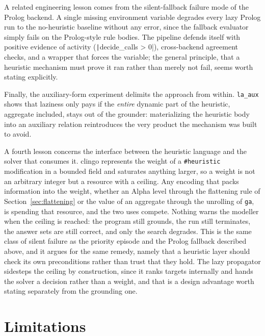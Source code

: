 A related engineering lesson comes from the silent-fallback failure mode of the Prolog backend. A single missing environment variable degrades every lazy Prolog run to the no-heuristic baseline without any error, since the fallback evaluator simply fails on the Prolog-style rule bodies. The pipeline defends itself with positive evidence of activity (\texttt|decide_calls > 0|), cross-backend agreement checks, and a wrapper that forces the variable; the general principle, that a heuristic mechanism must prove it ran rather than merely not fail, seems worth stating explicitly.

Finally, the auxiliary-form experiment delimits the approach from within. \texttt{la\_aux} shows that laziness only pays if the \emph{entire} dynamic part of the heuristic, aggregate included, stays out of the grounder: materializing the heuristic body into an auxiliary relation reintroduces the very product the mechanism was built to avoid.

A fourth lesson concerns the interface between the heuristic language and the solver that consumes it. clingo represents the weight of a \texttt{\#heuristic} modification in a bounded field and saturates anything larger, so a weight is not an arbitrary integer but a resource with a ceiling. Any encoding that packs information into the weight, whether an Alpha level through the flattening rule of Section~\ref{sec:flattening} or the value of an aggregate through the unrolling of \texttt{ga}, is spending that resource, and the two uses compete. Nothing warns the modeller when the ceiling is reached: the program still grounds, the run still terminates, the answer sets are still correct, and only the search degrades. This is the same class of silent failure as the priority episode and the Prolog fallback described above, and it argues for the same remedy, namely that a heuristic layer should check its own preconditions rather than trust that they hold. The lazy propagator sidesteps the ceiling by construction, since it ranks targets internally and hands the solver a decision rather than a weight, and that is a design advantage worth stating separately from the grounding one.

\section{Limitations}

